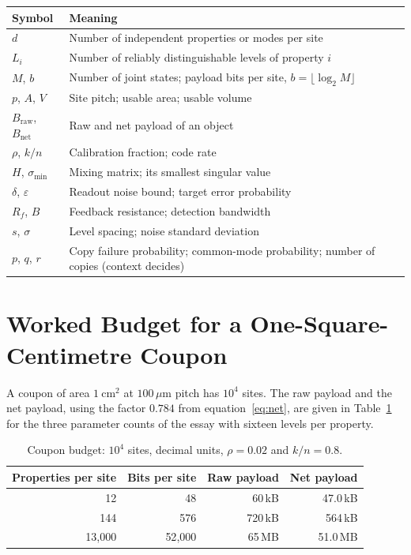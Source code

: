 \begin{table}[h]
\centering
\small
\begin{tabular}{@{}ll@{}}
\toprule
Symbol & Meaning \\
\midrule
$d$ & Number of independent properties or modes per site \\
$L_i$ & Number of reliably distinguishable levels of property $i$ \\
$M$, $b$ & Number of joint states; payload bits per site, $b=\lfloor\log_2M\rfloor$ \\
$p$, $A$, $V$ & Site pitch; usable area; usable volume \\
$B_{\mathrm{raw}}$, $B_{\mathrm{net}}$ & Raw and net payload of an object \\
$\rho$, $k/n$ & Calibration fraction; code rate \\
$H$, $\sigma_{\min}$ & Mixing matrix; its smallest singular value \\
$\delta$, $\varepsilon$ & Readout noise bound; target error probability \\
$R_f$, $B$ & Feedback resistance; detection bandwidth \\
$s$, $\sigma$ & Level spacing; noise standard deviation \\
$p$, $q$, $r$ & Copy failure probability; common-mode probability; number of copies (context decides) \\
\bottomrule
\end{tabular}
\end{table}

\section{Worked Budget for a One-Square-Centimetre Coupon}\label{app:budget}

A coupon of area $1\ \mathrm{cm^2}$ at $100\,\mu\mathrm m$ pitch has $10^{4}$ sites. The raw payload and the net payload, using the factor $0.784$ from equation~\eqref{eq:net}, are given in Table~\ref{tab:coupon} for the three parameter counts of the essay with sixteen levels per property.

\begin{table}[h]
\centering
\small
\begin{tabular}{@{}rrrr@{}}
\toprule
Properties per site & Bits per site & Raw payload & Net payload \\
\midrule
12 & 48 & 60\,kB & 47.0\,kB \\
144 & 576 & 720\,kB & 564\,kB \\
13{,}000 & 52{,}000 & 65\,MB & 51.0\,MB \\
\bottomrule
\end{tabular}
\caption{Coupon budget: $10^{4}$ sites, decimal units, $\rho=0.02$ and $k/n=0.8$.}
\label{tab:coupon}
\end{table}

